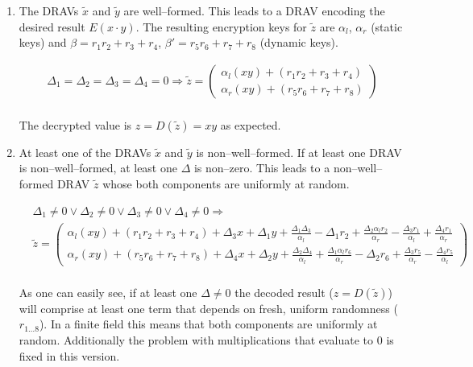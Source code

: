 \begin{enumerate}

  \item The DRAVs $\widetilde{x}$ and $\widetilde{y}$ are
    well--formed.  This leads to a DRAV encoding the desired result $E(x \cdot
    y)$. The resulting encryption keys for $\widetilde{z}$ are $\alpha_l$,
    $\alpha_r$ (static keys) and $\beta = r_1r_2 + r_3 + r_4$, $\beta' = r_5r_6
    + r_7 + r_8$ (dynamic keys).

\begin{align*}
  \Delta_1=\Delta_2=\Delta_3=\Delta_4=0 \Rightarrow
  \widetilde{z} =
  \begin{pmatrix}
    \alpha_l(xy) + (r_1r_2 + r_3 + r_4) \\
    \alpha_r(xy) + (r_5r_6 + r_7 + r_8)
  \end{pmatrix} \\
\end{align*}

\noindent{}The decrypted value is $z = D(\widetilde{z}) = xy$ as expected.

\item At least one of the DRAVs $\widetilde{x}$ and $\widetilde{y}$ is
  non--well--formed. If at least one DRAV is non--well--formed, at least one
  $\Delta$ is non--zero. This leads to a non--well--formed DRAV $\widetilde{z}$
  whose both components are uniformly at random.

\begin{align*}
  &
  \Delta_1 \neq 0 \vee \Delta_2 \neq 0 \vee
  \Delta_3 \neq 0 \vee \Delta_4 \neq 0
  \Rightarrow \\
  &
  \widetilde{z} =
  \begin{pmatrix}
    \alpha_l(xy) + (r_1r_2 + r_3 + r_4)
    + \Delta_3x + \Delta_1y
    + \frac{\Delta_1\Delta_3}{\alpha_l}
    - \Delta_1r_2
    + \frac{\Delta_2\alpha_lr_2}{\alpha_r}
    - \frac{\Delta_3r_1}{\alpha_l}
    + \frac{\Delta_4r_1}{\alpha_r}
    \\
    \alpha_r(xy) + (r_5r_6 + r_7 + r_8)
    + \Delta_4x + \Delta_2y
    + \frac{\Delta_2\Delta_4}{\alpha_l}
    + \frac{\Delta_1\alpha_lr_6}{\alpha_r}
    - \Delta_2r_6
    + \frac{\Delta_3r_5}{\alpha_r}
    - \frac{\Delta_4r_5}{\alpha_l}
  \end{pmatrix} \\
\end{align*}

\noindent{}As one can easily see, if at least one $\Delta \neq 0$ the decoded
result ($z = D(\widetilde{z})$) will comprise at least one term that depends on
fresh, uniform randomness ($r_{1 \ldots 8}$). In a finite field this means that
both components are uniformly at random. Additionally the problem with
multiplications that evaluate to $0$ is fixed in this version.

\end{enumerate}

